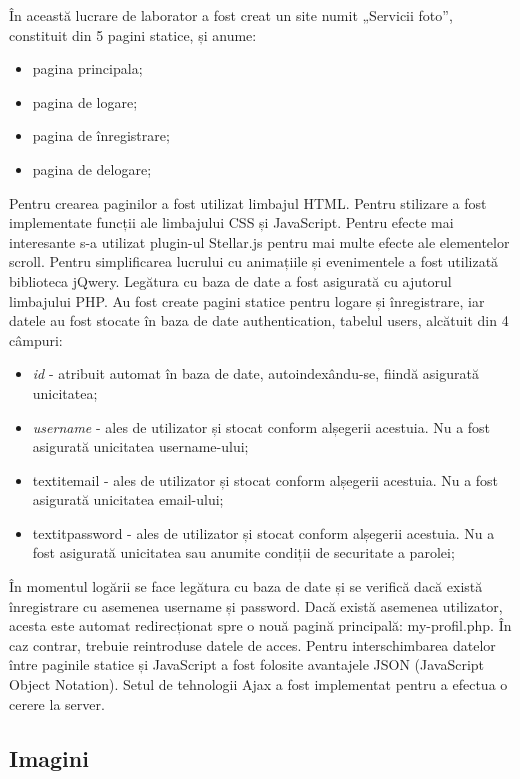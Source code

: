 	În această lucrare de laborator a fost creat un site numit „Servicii foto”, constituit din 5 pagini statice, și anume:
	\begin{itemize}
	\item pagina principala;
	\item pagina de logare;
	\item pagina de înregistrare;
	\item pagina de delogare;
	\end{itemize}
	Pentru crearea paginilor a fost utilizat limbajul HTML. Pentru stilizare a fost implementate funcții ale limbajului CSS și JavaScript. Pentru efecte mai interesante s-a utilizat plugin-ul Stellar.js pentru mai multe efecte ale elementelor scroll. Pentru simplificarea lucrului cu animațiile și evenimentele a fost utilizată biblioteca jQwery.
	Legătura cu baza de date a fost asigurată cu ajutorul limbajului PHP. Au fost create pagini statice pentru logare și înregistrare, iar datele au fost stocate în baza de date authentication, tabelul users, alcătuit din 4 câmpuri:
	\begin{itemize}
	\item \textit{id} - atribuit automat în baza de date, autoindexându-se, fiindă asigurată unicitatea;
	\item \textit{username} - ales de utilizator și stocat conform alșegerii acestuia. Nu a fost asigurată unicitatea username-ului;
	\item textit{email} - ales de utilizator și stocat conform alșegerii acestuia. Nu a fost asigurată unicitatea email-ului;
	\item textit{password} - ales de utilizator și stocat conform alșegerii acestuia. Nu a fost asigurată unicitatea sau anumite condiții de securitate a parolei;
	\end{itemize}

	În momentul logării se face legătura cu baza de date și se verifică dacă există înregistrare cu asemenea username și password. Dacă există asemenea utilizator, acesta este automat redirecționat spre o nouă pagină principală: my-profil.php. În caz contrar, trebuie reintroduse datele de acces.
	Pentru interschimbarea datelor între paginile statice și JavaScript a fost folosite avantajele JSON (JavaScript Object Notation). Setul de tehnologii Ajax a fost implementat pentru a efectua o cerere la server. 
	
\subsection{Imagini}

